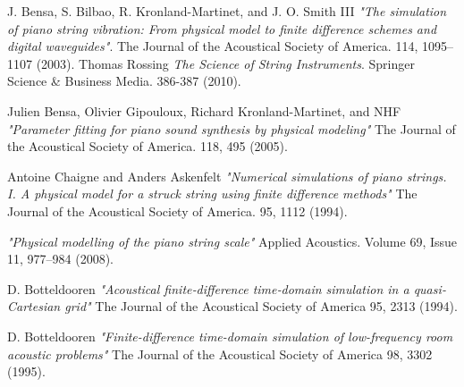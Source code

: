 \documentclass[a4paper,12pt]{article}
\begin{document}
\begin{thebibliography}{9}
                J. Bensa, S. Bilbao, R. Kronland-Martinet, and J. O. Smith III
                \textit{"The simulation of piano string vibration: From physical model to 
                finite difference schemes and digital waveguides"}.
                The Journal of the Acoustical Society of America. 114, 1095–1107 (2003).
			Thomas Rossing
			\textit{The Science of String Instruments}.
            Springer Science \& Business Media. 386-387 (2010).

			Julien Bensa, Olivier Gipouloux, Richard Kronland-Martinet, and NHF
			\textit{"Parameter fitting for piano sound synthesis by physical modeling"}
			The Journal of the Acoustical Society of America. 118, 495 (2005).
		            
        	Antoine Chaigne and Anders Askenfelt
        	\textit{"Numerical simulations of piano strings. I. A physical model
for a struck string using finite difference methods"}
			The Journal of the Acoustical Society of America. 95, 1112 (1994).
		
			\textit{"Physical modelling of the piano string scale"}
			Applied Acoustics. Volume 69, Issue 11, 977–984 (2008).
		
			D. Botteldooren
			\textit{"Acoustical finite‐difference time‐domain simulation in a quasi‐Cartesian grid"}
			The Journal of the Acoustical Society of America 95, 2313 (1994).
		
			D. Botteldooren
			\textit{"Finite-difference time-domain simulation of low-frequency room acoustic problems"}
			The Journal of the Acoustical Society of America 98, 3302 (1995).
\end{thebibliography}
\end{document}
